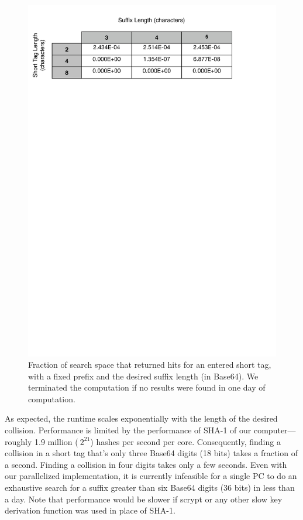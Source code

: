 \documentclass{sig-alternate-arxiv}
\begin{document}
\begin{figure}
\begin{center}
\includegraphics[scale=.5, viewport=0cm 0cm 16.5cm 7.5cm]{collider-hits.pdf}
\caption{Fraction of search space that returned hits for an entered short
  tag, with a fixed prefix and the desired suffix length (in
  Base64). We terminated the computation if no results were found in
  one day of computation.\label{fig:collider-hits}}
\end{center}
\end{figure}
\fi

As expected, the runtime scales exponentially with the length of the
desired collision.  Performance is limited by the performance of SHA-1
of our computer--- roughly 1.9 million ($~2^{21}$) hashes per second per
core.
Consequently, finding a collision in a short tag that's only three
Base64 digits (18 bits) takes a fraction of a second. Finding a
collision in four digits takes only a few seconds. Even with our
parallelized implementation, it is currently infeasible for a single PC
to do an exhaustive search for a suffix greater than six Base64 digits
(36 bits) in less than a day. Note that performance would be slower if
scrypt or any other slow key derivation function was used in place of
SHA-1.
\end{document}
